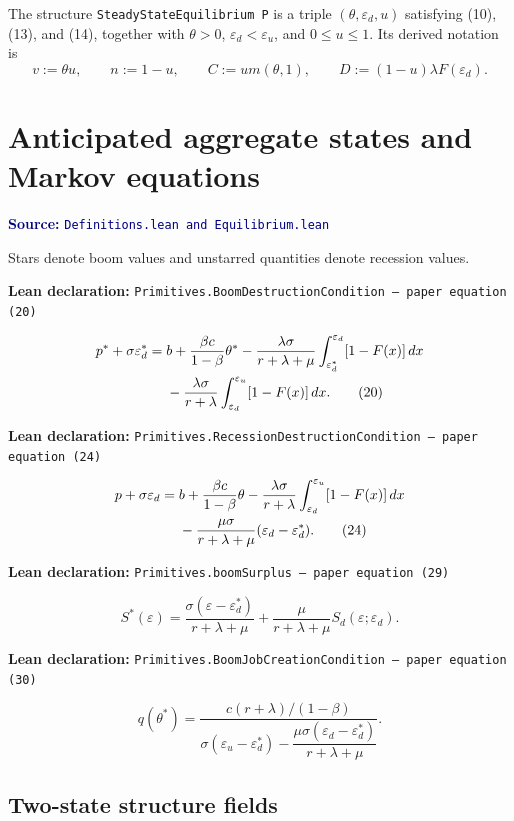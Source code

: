 \documentclass[11pt]{article}
\newcommand{\code}[1]{\texttt{#1}}
\newcommand{\leanfile}[1]{\texttt{#1}}
\newcommand{\epsd}{\varepsilon_d}
\newcommand{\epsu}{\varepsilon_u}
\newcommand{\mworker}[1]{m(#1,1)}
\newcommand{\decl}[1]{\par\smallskip\noindent\colorbox{softblue}{\parbox{0.965\linewidth}{\textbf{Lean declaration:} \code{#1}}}\par\smallskip}
\newcommand{\source}[1]{\textcolor{navy}{\small\textbf{Source:} \leanfile{#1}}}
\begin{document}
The structure \code{SteadyStateEquilibrium P} is a triple $(\theta,\epsd,u)$
satisfying (10), (13), and (14), together with
$\theta>0$, $\epsd<\epsu$, and $0\le u\le1$.
Its derived notation is
\begin{equation*}
v:=\theta u,\qquad n:=1-u,\qquad
C:=u\mworker{\theta},\qquad
D:=(1-u)\lambda F(\epsd).
\end{equation*}

\section{Anticipated aggregate states and Markov equations}

\source{Definitions.lean and Equilibrium.lean}

Stars denote boom values and unstarred quantities denote recession values.

\decl{Primitives.BoomDestructionCondition --- paper equation (20)}
\begin{align}
p^*+\sigma\epsd^*
={}&b+\frac{\beta c}{1-\beta}\theta^*
-\frac{\lambda\sigma}{r+\lambda+\mu}
  \int_{\epsd^*}^{\epsd}[1-F(x)]\,dx \notag\\
&-\frac{\lambda\sigma}{r+\lambda}
  \int_{\epsd}^{\epsu}[1-F(x)]\,dx. \tag{20}
\end{align}

\decl{Primitives.RecessionDestructionCondition --- paper equation (24)}
\begin{align}
p+\sigma\epsd
={}&b+\frac{\beta c}{1-\beta}\theta
-\frac{\lambda\sigma}{r+\lambda}
  \int_{\epsd}^{\epsu}[1-F(x)]\,dx \notag\\
&-\frac{\mu\sigma}{r+\lambda+\mu}(\epsd-\epsd^*). \tag{24}
\end{align}

\decl{Primitives.boomSurplus --- paper equation (29)}
\begin{equation}
S^*(\varepsilon)
=\frac{\sigma(\varepsilon-\epsd^*)}{r+\lambda+\mu}
+\frac{\mu}{r+\lambda+\mu}S_d(\varepsilon;\epsd). \tag{29}
\end{equation}

\decl{Primitives.BoomJobCreationCondition --- paper equation (30)}
\begin{equation}
q(\theta^*)
=\frac{c(r+\lambda)/(1-\beta)}
{\sigma(\epsu-\epsd^*)
-\dfrac{\mu\sigma(\epsd-\epsd^*)}{r+\lambda+\mu}}. \tag{30}
\end{equation}

\subsection{Two-state structure fields}
\end{document}
